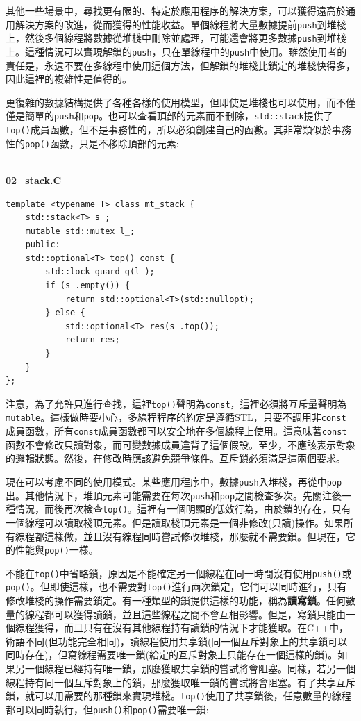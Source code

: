 其他一些場景中，尋找更有限的、特定於應用程序的解決方案，可以獲得遠高於通用解決方案的改進，從而獲得的性能收益。單個線程將大量數據提前\texttt{push}到堆棧上，然後多個線程將數據從堆棧中刪除並處理，可能還會將更多數據\texttt{push}到堆棧上。這種情況可以實現解鎖的\texttt{push}，只在單線程中的\texttt{push}中使用。雖然使用者的責任是，永遠不要在多線程中使用這個方法，但解鎖的堆棧比鎖定的堆棧快得多，因此這裡的複雜性是值得的。

更復雜的數據結構提供了各種各樣的使用模型，但即使是堆棧也可以使用，而不僅僅是簡單的\texttt{push}和\texttt{pop}。也可以查看頂部的元素而不刪除，\texttt{std::stack}提供了\texttt{top()}成員函數，但不是事務性的，所以必須創建自己的函數。其非常類似於事務性的\texttt{pop()}函數，只是不移除頂部的元素:

\hspace*{\fill} \\ %
\noindent
\textbf{02\_stack.C}
\begin{lstlisting}[style=styleCXX]
template <typename T> class mt_stack {
	std::stack<T> s_;
	mutable std::mutex l_;
	public:
	std::optional<T> top() const {
		std::lock_guard g(l_);
		if (s_.empty()) {
			return std::optional<T>(std::nullopt);
		} else {
			std::optional<T> res(s_.top());
			return res;
		}
	}
};
\end{lstlisting}

注意，為了允許只進行查找，這裡\texttt{top()}聲明為\texttt{const}，這裡必須將互斥量聲明為\texttt{mutable}。這樣做時要小心，多線程程序的約定是遵循STL，只要不調用非\texttt{const}成員函數，所有\texttt{const}成員函數都可以安全地在多個線程上使用。這意味著\texttt{const}函數不會修改只讀對象，而可變數據成員違背了這個假設。至少，不應該表示對象的邏輯狀態。然後，在修改時應該避免競爭條件。互斥鎖必須滿足這兩個要求。

現在可以考慮不同的使用模式。某些應用程序中，數據\texttt{push}入堆棧，再從中\texttt{pop}出。其他情況下，堆頂元素可能需要在每次\texttt{push}和\texttt{pop}之間檢查多次。先關注後一種情況，而後再次檢查\texttt{top()}。這裡有一個明顯的低效行為，由於鎖的存在，只有一個線程可以讀取棧頂元素。但是讀取棧頂元素是一個非修改(只讀)操作。如果所有線程都這樣做，並且沒有線程同時嘗試修改堆棧，那麼就不需要鎖。但現在，它的性能與\texttt{pop()}一樣。

不能在\texttt{top()}中省略鎖，原因是不能確定另一個線程在同一時間沒有使用\texttt{push()}或\texttt{pop()}。但即使這樣，也不需要對\texttt{top()}進行兩次鎖定，它們可以同時進行，只有修改堆棧的操作需要鎖定。有一種類型的鎖提供這樣的功能，稱為\textbf{讀寫鎖}。任何數量的線程都可以獲得讀鎖，並且這些線程之間不會互相影響。但是，寫鎖只能由一個線程獲得，而且只有在沒有其他線程持有讀鎖的情況下才能獲取。在C++中，術語不同(但功能完全相同)，讀線程使用共享鎖(同一個互斥對象上的共享鎖可以同時存在)，但寫線程需要唯一鎖(給定的互斥對象上只能存在一個這樣的鎖)。如果另一個線程已經持有唯一鎖，那麼獲取共享鎖的嘗試將會阻塞。同樣，若另一個線程持有同一個互斥對象上的鎖，那麼獲取唯一鎖的嘗試將會阻塞。有了共享互斥鎖，就可以用需要的那種鎖來實現堆棧。\texttt{top()}使用了共享鎖後，任意數量的線程都可以同時執行，但\texttt{push()}和\texttt{pop()}需要唯一鎖:

